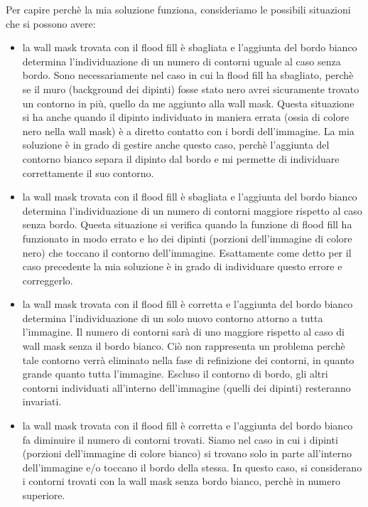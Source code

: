 \documentclass[10pt,twocolumn,letterpaper]{article}
\begin{document}
Per capire perchè la mia soluzione funziona, consideriamo le possibili situazioni che si possono avere:
\begin{itemize}
   \item la wall mask trovata con il flood fill è sbagliata e l'aggiunta del bordo bianco determina l'individuazione di un numero di contorni uguale al caso senza bordo. Sono necessariamente nel caso in cui la flood fill ha sbagliato, perchè se il muro (background dei dipinti) fosse stato nero avrei sicuramente trovato un contorno in più, quello da me aggiunto alla wall mask. Questa situazione si ha anche quando il dipinto individuato in maniera errata (ossia di colore nero nella wall mask) è a diretto contatto con i bordi dell'immagine. La mia soluzione è in grado di gestire anche questo caso, perchè l'aggiunta del contorno bianco separa il dipinto dal bordo e mi permette di individuare correttamente il suo contorno.
   
   \item la wall mask trovata con il flood fill è sbagliata e l'aggiunta del bordo bianco determina l'individuazione di un numero di contorni maggiore rispetto al caso senza bordo. Questa situazione si verifica quando la funzione di flood fill ha funzionato in modo errato e ho dei dipinti (porzioni dell'immagine di colore nero) che toccano il contorno dell'immagine. Esattamente come detto per il caso precedente la mia soluzione è in grado di individuare questo errore e correggerlo. 

   \item la wall mask trovata con il flood fill è corretta e l'aggiunta del bordo bianco determina l'individuazione di un solo nuovo contorno attorno a tutta l'immagine. Il numero di contorni sarà di uno maggiore rispetto al caso di wall mask senza il bordo bianco. Ciò non rappresenta un problema perchè tale contorno verrà eliminato nella fase di refinizione dei contorni, in quanto grande quanto tutta l'immagine. Escluso il contorno di bordo, gli altri contorni individuati all'interno dell'immagine (quelli dei dipinti) resteranno invariati.
   
   \item la wall mask trovata con il flood fill è corretta e l'aggiunta del bordo bianco fa diminuire il numero di contorni trovati. Siamo nel caso in cui i dipinti (porzioni dell'immagine di colore bianco) si trovano solo in parte all'interno dell'immagine e/o toccano il bordo della stessa. In questo caso, si considerano i contorni trovati con la wall mask senza bordo bianco, perchè in numero superiore. 
\end{itemize}
\end{document}
